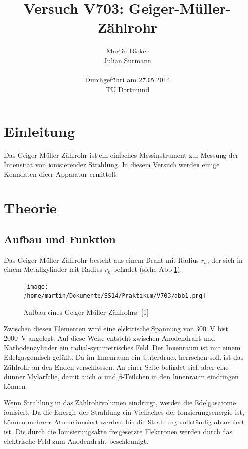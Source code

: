\documentclass[11pt,ngerman,a4paper]{article}
\title{\textbf{Versuch V703: Geiger-Müller-Zählrohr}}
\author{Martin Bieker\\
		Julian Surmann\\
		\\
		Durchgef\"{u}hrt am 27.05.2014\\
		TU Dortmund}
\date{}
\begin{document}
\renewcommand\tablename{Tabelle}
\renewcommand\figurename{Abbildung}
\maketitle
\thispagestyle{empty}
\newpage
\clearpage
\setcounter{page}{1}


\section{Einleitung}
Das Geiger-Müller-Zählrohr ist ein einfaches Messinstrument zur Messung der Intensität von ionisierender Strahlung. In diesem Versuch werden einige Kenndaten dieer Apparatur ermittelt.
\section{Theorie}
\subsection{Aufbau und Funktion} 
 Das Geiger-Müller-Zählrohr besteht aus einem Draht  mit Radius $r_a$, der sich in einem Metallzylinder mit Radius $r_k$ befindet (siehe Abb \ref{abb1}). 
\begin{figure}[htp]
\centering
\texttt{[image: /home/martin/Dokumente/SS14/Praktikum/V703/abb1.png]}
\caption{Aufbau eines Geiger-Müller-Zählrohrs. [1]}
\label{abb1}
\end{figure} 
Zwischen diesen Elementen wird eine elektrische Spannung von \SI{300}{\volt} bist \SI{2000}{\volt} angelegt. Auf diese Weise entsteht zwischen Anodendraht und Kathodenzylinder ein radial-symmetrisches Feld. Der Innenraum ist mit einem  Edelgasgemisch gefüllt. Da im Innenraum ein Unterdruck herrschen soll, ist das Zählrohr an den Enden verschlossen. An einer Seite befindet sich aber eine dünner Mylarfolie, damit  auch $\alpha$ und $\beta$-Teilchen in den Innenraum eindringen können.
 
 \noindent
 Wenn Strahlung in das Zählrohrvolumen eindringt, werden die Edelgasatome ionisiert. Da die Energie der Strahlung ein Vielfaches der Ionsierungsenergie ist, können mehrere Atome ionsiert werden, bis die Strahlung vollständig absorbiert ist. Die durch die Ionisierungsakte freigesetzte Elektronen werden durch das elektrische Feld  zum Anodendraht beschleunigt.
\end{document}
